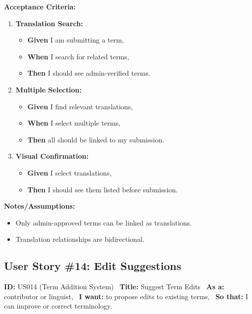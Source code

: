 \documentclass[12pt]{article}
\begin{document}
\vspace{1em}
\textbf{Acceptance Criteria:}
\begin{enumerate}
\item \textbf{Translation Search:}
\begin{itemize}
\item \textbf{Given} I am submitting a term,
\item \textbf{When} I search for related terms,
\item \textbf{Then} I should see admin-verified terms.
\end{itemize}

\item \textbf{Multiple Selection:}
\begin{itemize}
    \item \textbf{Given} I find relevant translations,
    \item \textbf{When} I select multiple terms,
    \item \textbf{Then} all should be linked to my submission.
\end{itemize}

\item \textbf{Visual Confirmation:}
\begin{itemize}
    \item \textbf{Given} I select translations,
    \item \textbf{Then} I should see them listed before submission.
\end{itemize}
\end{enumerate}

\vspace{1em}
\textbf{Notes/Assumptions:}
\begin{itemize}
\item Only admin-approved terms can be linked as translations.
\item Translation relationships are bidirectional.
\end{itemize}

\subsection{User Story \#14: Edit Suggestions}
\textbf{ID:} US014 (Term Addition System) \
\textbf{Title:} Suggest Term Edits \
\textbf{As a:} contributor or linguist, \
\textbf{I want:} to propose edits to existing terms, \
\textbf{So that:} I can improve or correct terminology.
\end{document}

